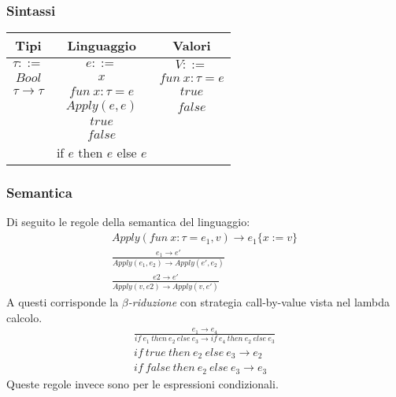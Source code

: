 \subsubsection{Sintassi}
\begin{center}
	\begin{tabular}{|c|c|c|}
		\hline
		\textbf{Tipi} & \textbf{Linguaggio} & \textbf{Valori} \\
		\hline
		$\tau ::=$ & $e::=$ & $V::=$\\
		\hline
		$Bool$ & $x$& $fun \: x:\tau = e$\\
		$\tau \rightarrow \tau$ \footnotemark & $fun \: x: \tau = e$& $true$\\
		& $Apply(e,e)$ & $false$\\
		& $true$ & \\
		& $false$ & \\
		& if $e$ then $e$ else $e$ & \\
		\hline
	\end{tabular}
\end{center}

\subsubsection{Semantica}
Di seguito le regole della semantica del linguaggio:
\begin{gather}
	Apply(fun \: x:\tau = e_1,v) \rightarrow e_1 \{x:=v\} \label{eq_briduz}\\
	\frac{e_1 \rightarrow e'}{Apply(e_1, e_2) \rightarrow Apply(e', e_2)} \\
	 \frac{e2 \rightarrow e'}{Apply(v,e2) \rightarrow Apply(v, e')}
\end{gather}
A questi corrisponde la \textit{$\beta$-riduzione} con strategia call-by-value vista nel lambda calcolo.
\begin{gather}
	\frac{e_1 \rightarrow e_4}{if \: e_1 \: then \: e_2 \: else \: e_3 \rightarrow if \: e_4 \: then \: e_2 \: else \: e_3} \\
	if \: true \: then \: e_2 \: else \: e_3 \rightarrow e_2 \\
	if \: false \: then \: e_2 \: else \: e_3 \rightarrow e_3
\end{gather}
Queste regole invece sono per le espressioni condizionali.
